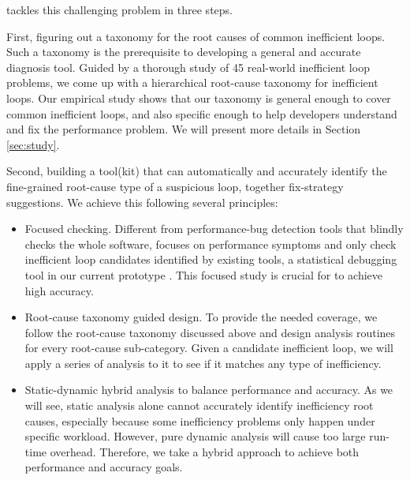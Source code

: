 \Tool tackles this challenging problem in three steps.

First, figuring out a taxonomy for the root causes of common inefficient loops.
Such a taxonomy is the prerequisite to developing a general and accurate
diagnosis tool. Guided by a thorough study of 45 real-world inefficient
loop problems, we come up with a hierarchical root-cause taxonomy for
inefficient loops. 
Our empirical study shows that our taxonomy is general enough to cover
common inefficient loops, and also specific enough to help developers understand
and fix the performance problem. We will present more details 
in Section \ref{sec:study}.
 
Second, building a tool(kit) \Tool that can automatically and accurately
identify the fine-grained root-cause type of a suspicious loop, 
together fix-strategy suggestions. 
We achieve this following several principles:

\begin{itemize}
\item Focused checking. 
Different from performance-bug detection tools that blindly checks the whole
software, \Tool focuses on performance symptoms and only check inefficient
loop candidates identified by existing tools, a statistical debugging
tool in our current prototype \citep{SongOOPSLA2014}. 
This focused study is crucial for \Tool to achieve high
accuracy.

\item Root-cause taxonomy guided design. To provide the needed coverage, we follow
the root-cause taxonomy discussed above and design analysis routines for 
every root-cause sub-category. Given a candidate inefficient loop, we will 
apply a series of analysis to it to see if it matches any type of inefficiency.

\item Static-dynamic hybrid analysis to balance performance and accuracy.
As we will see, static analysis alone cannot accurately identify 
inefficiency root causes, especially because some inefficiency problems only
happen under specific workload. However, pure dynamic analysis will 
cause too large 
run-time overhead. Therefore, we take a hybrid approach to achieve both
performance and accuracy goals.
\end{itemize}

